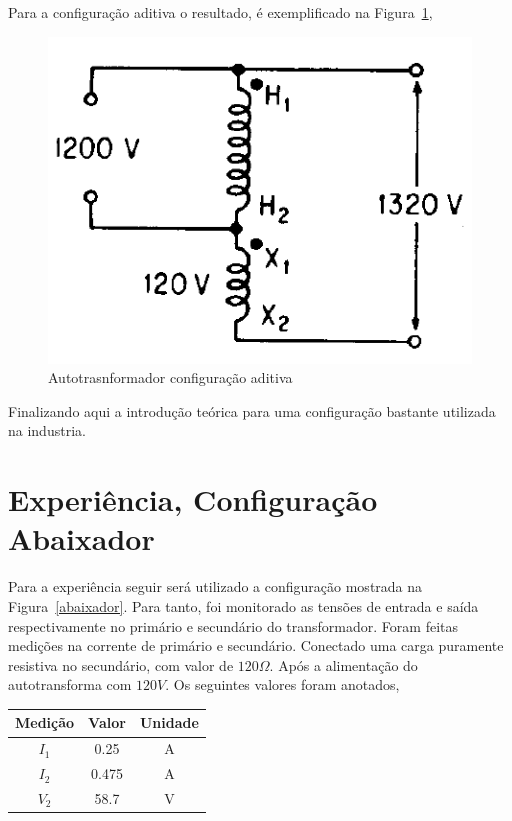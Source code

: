 \documentclass[paper=a4, fontsize=11pt]{article}
\begin{document}
Para a configuração aditiva o resultado, é exemplificado na Figura~\ref{isolador2},

\begin{figure}[!ht]
    \centering
    \includegraphics[scale=.4]{isolado2.png}
    \caption{Autotrasnformador configuração aditiva}
    \label{isolador2}
\end{figure}

Finalizando aqui a introdução teórica para uma configuração bastante utilizada na
industria.

\section{Experiência, Configuração Abaixador}

Para a experiência seguir será utilizado a configuração mostrada na 
Figura~\ref{abaixador}. Para tanto, foi monitorado as tensões de entrada e saída
respectivamente no primário e secundário do transformador. Foram feitas medições
na corrente de primário e secundário. Conectado uma carga puramente resistiva
no secundário, com valor de $120 \Omega$. Após a alimentação do
autotransforma com $120 V$. Os seguintes valores foram anotados,

\renewcommand{\arraystretch}{1.5}
\begin{center}
    \begin{tabular}{c||c||c}
        Medição & Valor & Unidade \\
        \hline
        $I_1$ & 0.25 & A \\
        $I_2$ & 0.475 & A \\
        $V_2$ & 58.7 & V \\
    \end{tabular}
\end{center}
\end{document}
